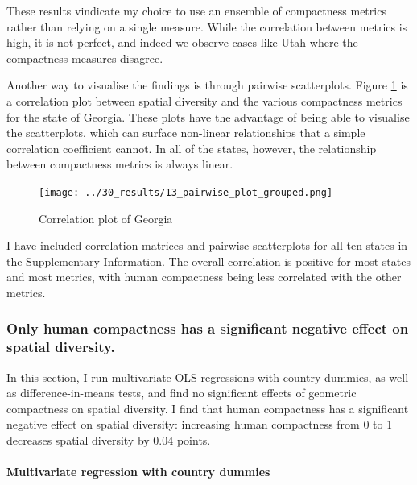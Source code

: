 \documentclass[]{article}
\let\oldparagraph\paragraph
\renewcommand{\paragraph}[1]{\oldparagraph{#1}\mbox{}}
\begin{document}
These results vindicate my choice to use an ensemble of compactness
metrics rather than relying on a single measure. While the correlation
between metrics is high, it is not perfect, and indeed we observe cases
like Utah where the compactness measures disagree.

Another way to visualise the findings is through pairwise scatterplots.
Figure \ref{pairwise_plot_grouped} is a correlation plot between spatial
diversity and the various compactness metrics for the state of Georgia.
These plots have the advantage of being able to visualise the
scatterplots, which can surface non-linear relationships that a simple
correlation coefficient cannot. In all of the states, however, the
relationship between compactness metrics is always linear.

\begin{figure}
\centering
\texttt{[image: ../30\_results/13\_pairwise\_plot\_grouped.png]}
\caption{Correlation plot of Georgia\label{pairwise_plot_grouped}}
\end{figure}

I have included correlation matrices and pairwise scatterplots for all
ten states in the Supplementary Information. The overall correlation is
positive for most states and most metrics, with human compactness being
less correlated with the other metrics.

\hypertarget{only-human-compactness-has-a-significant-negative-effect-on-spatial-diversity.}{%
\subsubsection{Only human compactness has a significant negative effect
on spatial
diversity.}\label{only-human-compactness-has-a-significant-negative-effect-on-spatial-diversity.}}

In this section, I run multivariate OLS regressions with country
dummies, as well as difference-in-means tests, and find no significant
effects of geometric compactness on spatial diversity. I find that human
compactness has a significant negative effect on spatial diversity:
increasing human compactness from 0 to 1 decreases spatial diversity by
0.04 points.

\hypertarget{multivariate-regression-with-country-dummies}{%
\paragraph{Multivariate regression with country
dummies}\label{multivariate-regression-with-country-dummies}}
\end{document}
